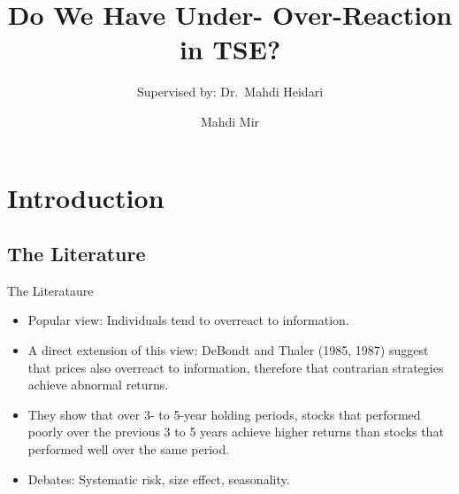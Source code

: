 \documentclass{beamer}
\title[Under- Over-Reaction in TSE]{Do We Have Under- Over-Reaction in TSE?}
\subtitle[]{Supervised by: Dr.\ Mahdi Heidari}
\author[Heidari, Mir]{Mahdi Mir}
\institute[]{TeIAS}
\begin{document}

\maketitle

\section{Introduction}

\subsection{The Literature}

\begin{frame}{The Literataure}
    \begin{itemize}
        \item Popular view: Individuals tend to overreact to information.
        \item A direct extension of this view: DeBondt and Thaler (1985, 1987) suggest that prices also overreact to information, therefore that contrarian strategies achieve abnormal returns.
        \item They show that over 3- to 5-year holding periods, stocks that performed poorly over the previous 3 to 5 years achieve higher returns than stocks that performed well over the same period.
        \item Debates: Systematic risk, size effect, seasonality.
    \end{itemize}
\end{frame}
\end{document}
